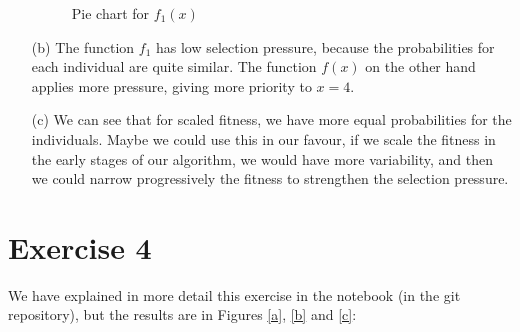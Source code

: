 \documentclass{scrartcl}
\begin{document}
\begin{itemize}
\begin{figure}[h!]
    \centering
    \caption{Pie chart for $f_1(x)$}
    \label{fig:pie2_1_2}
\end{figure}

\item[(b)]
The function $f_1$ has low selection pressure, because the probabilities for each individual are quite similar. The function $f(x)$ on the other hand applies more pressure, giving more priority to $x=4$.
\item[(c)]
We can see that for scaled fitness, we have more equal probabilities for the individuals. Maybe we could use this in our favour, if we scale the fitness in the early stages of our algorithm, we would have more variability, and then we could narrow progressively the fitness to strengthen the selection pressure.

\end{itemize}

\section*{Exercise 4}
We have explained in more detail this exercise in the notebook (in the git
repository), but the results are in Figures \ref{a}, \ref{b} and \ref{c}:
\end{document}
